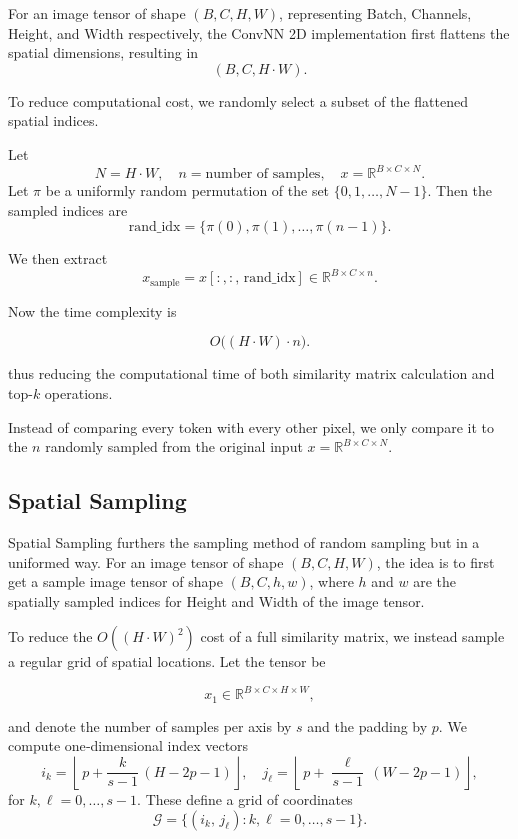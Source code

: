 \documentclass{article}
\begin{document}
For an image tensor of shape \((B, C, H, W)\), representing Batch, Channels, Height, and Width respectively, the ConvNN 2D implementation first flattens the spatial dimensions, resulting in
\[
(B, C, H \cdot W).
\]

To reduce computational cost, we randomly select a subset of the flattened spatial indices.

Let
\[
N = H \cdot W, \quad n = \text{number of samples}, \quad x = \mathbb{R}^{B \times C \times N}.
\]
Let \(\pi\) be a uniformly random permutation of the set \(\{0, 1, \ldots, N-1\}\). Then the sampled indices are
\[
\mathrm{rand\_idx} = \{\pi(0), \pi(1), \ldots, \pi(n-1)\}.
\]

We then extract
\[
x_{\mathrm{sample}} = x[:,:,\,\mathrm{rand\_idx}] \in \mathbb{R}^{B\times C \times n}.
\]


Now the time complexity is

\[
O\big((H \cdot W) \cdot n\big).
\]

thus reducing the computational time of both similarity matrix calculation and top-\(k\) operations. 

Instead of comparing every token with every other pixel, we only compare it to the \(n\) randomly sampled from the original input \(x = \mathbb{R}^{B \times C \times N}\). 


\subsection*{Spatial Sampling}

Spatial Sampling furthers the sampling method of random sampling but in a uniformed way. For an image tensor of shape \((B, C, H, W)\),  the idea is to first get a sample image tensor of shape 
\((B, C, h, w)\), where \(h\) and \(w\) are the spatially sampled indices for Height and Width of the image tensor. 


To reduce the \(O((H \cdot W)^2)\) cost of a full similarity matrix, we instead sample a regular grid of spatial locations.  Let the tensor be

\[
x_{1}\in\mathbb{R}^{B\times C\times H\times W},
\]

and denote the number of samples per axis by \(s\) and the padding by \(p\).  We compute one‐dimensional index vectors
\[
i_{k} = \left\lfloor\,p + \frac{k}{s-1}\,(H - 2p - 1)\right\rfloor,\quad
j_{\ell} = \left\lfloor\,p + \frac{\ell}{s-1}\,(W - 2p - 1)\right\rfloor,
\]
for \(k,\ell = 0,\dots,s-1\).  These define a grid of coordinates
\[
\mathcal{G} = \bigl\{(i_{k},\,j_{\ell}) : k,\ell=0,\dots,s-1\bigr\}.
\]
\end{document}

